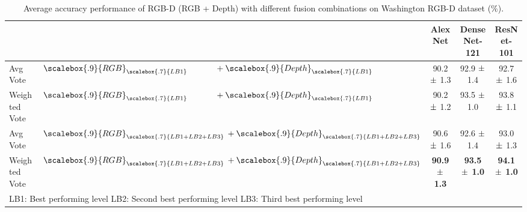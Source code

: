 \begin{table}[!h]
	\caption{Average accuracy performance of RGB-D (RGB + Depth) with different fusion combinations on Washington RGB-D dataset (\%).}  
	\label{table:rgbdFusions}    
	\centering
	\setlength{\tabcolsep}{0.9em} \def\arraystretch{1.2}
	\begin{adjustbox}{width=\columnwidth}
		\begin{tabular}{llccc}
			\hline
			&								       																				& AlexNet 						  & DenseNet-121 					& ResNet-101 				\\ \hline \hline
			Avg Vote 		& $\scalebox{.9}{RGB}_{\scalebox{.7}{LB1}} \kern 3.3em+ \scalebox{.9}{Depth}_{\scalebox{.7}{LB1}}$          		& 90.2 $\pm\hfil$ 1.3        	  & 92.9 $\pm\hfil$ 1.4           	& 92.7 $\pm\hfil$ 1.6         \\
			Weighted Vote 	& $\scalebox{.9}{RGB}_{\scalebox{.7}{LB1}} \kern 3.3em+ \scalebox{.9}{Depth}_{\scalebox{.7}{LB1}}$     			   	& 90.2 $\pm\hfil$ 1.2        	  & 93.5 $\pm\hfil$ 1.0          	& 93.8 $\pm\hfil$ 1.1          \\
			Avg Vote 		& $\scalebox{.9}{RGB}_{\scalebox{.7}{LB1+LB2+LB3}} \kern 0.2em+ \scalebox{.9}{Depth}_{\scalebox{.7}{LB1+LB2+LB3}}$  & 90.6 $\pm\hfil$ 1.6        	  & 92.6 $\pm\hfil$ 1.4          	& 93.0 $\pm\hfil$ 1.3           \\
			Weighted Vote 	& $\scalebox{.9}{RGB}_{\scalebox{.7}{LB1+LB2+LB3}} \kern 0.2em+ \scalebox{.9}{Depth}_{\scalebox{.7}{LB1+LB2+LB3}}$  & \textbf{90.9 $\pm\hfil$ 1.3}    & \textbf{93.5 $\pm\hfil$ 1.0}    & \textbf{94.1 $\pm\hfil$ 1.0} 	 \\ \hline
			\multicolumn{5}{l}{LB1: Best performing level \quad LB2: Second best performing level \quad LB3: Third best performing level}
		\end{tabular}
	\end{adjustbox}
\end{table}
 
